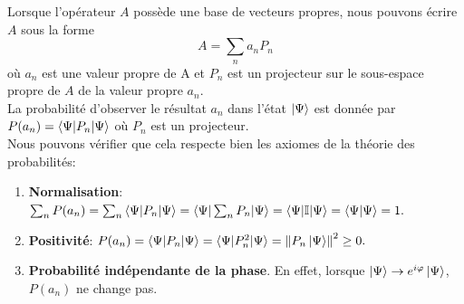 \documentclass[../notesdecours.tex]{subfiles}
\begin{document}
\begin{center}
\end{center}
Lorsque l'opérateur $A$ possède une base de vecteurs propres, nous pouvons écrire $A$ sous la forme\begin{equation}
A = \sum_n a_nP_n
\end{equation}
où $a_n$ est une valeur propre de A et $P_n$ est un projecteur sur le sous-espace propre de $A$ de la valeur propre $a_n$.\\

La probabilité d'observer le résultat $a_n$ dans l'état $\ket{\Psi}$ est donnée par $P(a_n) = \braket{\Psi|P_n|\Psi}$ où $P_n$ est un projecteur.\\

Nous pouvons vérifier que cela respecte bien les axiomes de la théorie des probabilités:
\begin{enumerate}
\item \textbf{Normalisation}: $\sum_n P(a_n) = \sum_n \braket{\Psi|P_n|\Psi} = \braket{\Psi|\sum_n P_n|\Psi} = \braket{\Psi|\mathbb{I}|\Psi} = \braket{\Psi|\Psi} = 1.$
\item \textbf{Positivité}: $P(a_n) = \braket{\Psi|P_n|\Psi} = \braket{\Psi|P_n^2|\Psi} = \norm{P_n\ket{\Psi}}^2 \geq 0.$
\item \textbf{Probabilité indépendante de la phase}. En effet, lorsque $\ket{\Psi}\to e^{i\varphi}\ket{\Psi}$, $P(a_n)$ ne change pas.
\end{enumerate}
\end{document}
